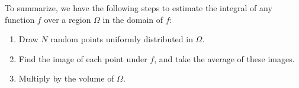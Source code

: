 To summarize, we have the following steps to estimate the integral of any function $f$ over a region $\Omega$ in the domain of $f$:
\begin{enumerate}
\item Draw $N$ random points uniformly distributed in $\Omega$.
\item Find the image of each point under $f$, and take the average of these images.
\item Multiply by the volume of $\Omega$.
\end{enumerate}

